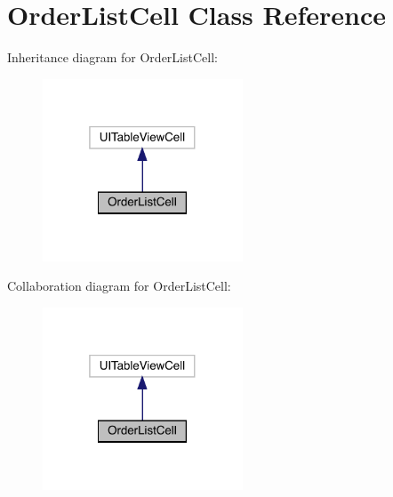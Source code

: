\hypertarget{interface_order_list_cell}{}\section{Order\+List\+Cell Class Reference}
\label{interface_order_list_cell}


Inheritance diagram for Order\+List\+Cell\+:\nopagebreak
\begin{figure}[H]
\begin{center}
\leavevmode
\includegraphics[width=169pt]{interface_order_list_cell__inherit__graph}
\end{center}
\end{figure}


Collaboration diagram for Order\+List\+Cell\+:\nopagebreak
\begin{figure}[H]
\begin{center}
\leavevmode
\includegraphics[width=169pt]{interface_order_list_cell__coll__graph}
\end{center}
\end{figure}
